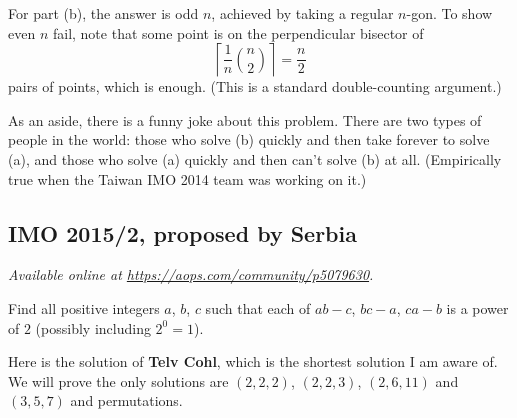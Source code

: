 \documentclass[11pt]{scrartcl}
\begin{document}
For part (b), the answer is odd $n$, achieved by taking a regular $n$-gon.
To show even $n$ fail, note that some point is on the perpendicular bisector of
\[ \left\lceil \frac 1n \binom n2 \right\rceil = \frac{n}{2} \]
pairs of points, which is enough.
(This is a standard double-counting argument.)

As an aside, there is a funny joke about this problem.
There are two types of people in the world:
those who solve (b) quickly and then take forever to solve (a),
and those who solve (a) quickly and then can't solve (b) at all.
(Empirically true when the Taiwan IMO 2014 team was working on it.)
\pagebreak

\subsection{IMO 2015/2, proposed by Serbia}
\textsl{Available online at \url{https://aops.com/community/p5079630}.}
\begin{mdframed}[style=mdpurplebox,frametitle={Problem statement}]
Find all positive integers $a$, $b$, $c$ such that
each of $ab-c$, $bc-a$, $ca-b$ is a power of $2$
(possibly including $2^0=1$).
\end{mdframed}
Here is the solution of \textbf{Telv Cohl},
which is the shortest solution I am aware of.
We will prove the only solutions are $(2,2,2)$, $(2,2,3)$,
$(2,6,11)$ and $(3,5,7)$ and permutations.
\end{document}

